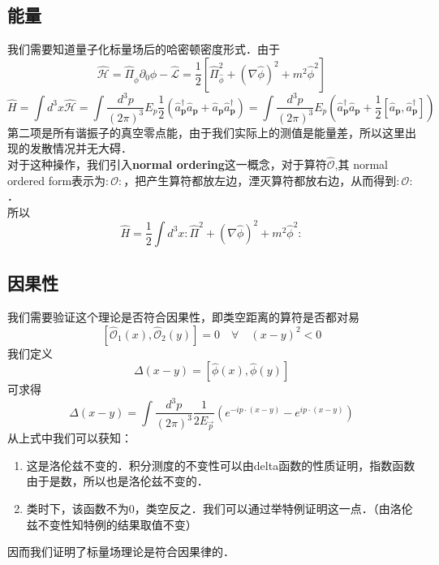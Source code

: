 \subsection{能量}
我们需要知道量子化标量场后的哈密顿密度形式．由于
\begin{equation}
\hat{\mathcal{H}}=\hat{\Pi}_{\hat{\phi}} \partial_{0} \hat{\phi}-\hat{\mathcal{L}}=\frac{1}{2}\left[\hat{\Pi}_{\hat{\phi}}^{2}+(\nabla \hat{\phi})^{2}+m^{2} \hat{\phi}^{2}\right]
\end{equation}
\begin{equation}
\hat{H}=\int d^{3} x \hat{\mathcal{H}}=\int \frac{d^{3} p}{(2 \pi)^{3}} E_{p} \frac{1}{2}\left(\hat{a}_{\mathbf{p}}^{\dagger} \hat{a}_{\mathbf{p}}+\hat{a}_{\mathbf{p}} \hat{a}_{\mathbf{p}}^{\dagger}\right)=\int \frac{d^{3} p}{(2 \pi)^{3}} E_{p}\left(\hat{a}_{\mathbf{p}}^{\dagger} \hat{a}_{\mathbf{p}}+\frac{1}{2}\left[\hat{a}_{\mathbf{p}}, \hat{a}_{\mathbf{p}}^{\dagger}\right]\right)
\end{equation}
第二项是所有谐振子的真空零点能，由于我们实际上的测值是能量差，所以这里出现的发散情况并无大碍．\\
对于这种操作，我们引入\textbf{normal ordering}这一概念，对于算符$\hat{\mathcal{O}}$,其 normal ordered form表示为$:\mathcal{O}:$，把产生算符都放左边，湮灭算符都放右边，从而得到$:\mathcal{O}:$．\\所以
\begin{equation}
\hat{H}=\frac{1}{2} \int d^{3} x: \hat{\Pi}^{2}+(\nabla \hat{\phi})^{2}+m^{2} \hat{\phi}^{2}:
\end{equation}
\subsection{因果性}
我们需要验证这个理论是否符合因果性，即类空距离的算符是否都对易
\begin{equation}
\left[\mathcal{\hat{O}}_{1}(x), \mathcal{\hat{O}}_{2}(y)\right]=0 \quad \forall \quad(x-y)^{2}<0
\end{equation}
我们定义
\begin{equation}
\Delta(x-y)=[\hat{\phi}(x), \hat{\phi}(y)]
\end{equation}
可求得
\begin{equation}
\Delta(x-y)=\int \frac{d^{3} p}{(2 \pi)^{3}} \frac{1}{2 E_{\vec{p}}}\left(e^{-i p \cdot(x-y)}-e^{i p \cdot(x-y)}\right)
\end{equation}
从上式中我们可以获知：\\
\begin{enumerate}
\item 这是洛伦兹不变的．积分测度的不变性可以由delta函数的性质证明，指数函数由于是数，所以也是洛伦兹不变的．
\item 类时下，该函数不为0，类空反之．我们可以通过举特例证明这一点．（由洛伦兹不变性知特例的结果取值不变）
\end{enumerate}
因而我们证明了标量场理论是符合因果律的．
